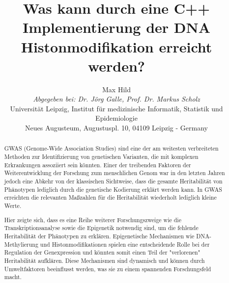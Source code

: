 \documentclass{SeminarV2}
\begin{document}
\title{Was kann durch eine C++ Implementierung der DNA Histonmodifikation erreicht werden?}

\author{Max Hild
\vspace{.3cm}\\
%
\emph{Abgegeben bei: Dr. J{\"o}rg Galle, Prof. Dr. Markus Scholz}
\vspace{.1cm}\\
Universit{\"a}t Leipzig, Institut f{\"u}r medizinische Informatik, Statistik und Epidemiologie\\
Neues Augusteum, Augustuspl. 10, 04109 Leipzig - Germany
}



\maketitle

\begin{abstract}
  \sloppy
  GWAS (Genome-Wide Association Studies) sind eine der am weitesten verbreiteten Methoden
  zur Identifizierung von genetischen Varianten, die mit komplexen Erkrankungen assoziiert sein k{\"o}nnten.
  Einer der treibenden Faktoren der Weiterentwicklung der Forschung zum menschlichen Genom
  war in den letzten Jahren jedoch eine Abkehr von der klassischen Sichtweise, dass die
  gesamte Heritabilit{\"a}t von Ph{\"a}notypen lediglich durch die genetische Kodierung
  erkl{\"a}rt werden kann. In GWAS erreichten die relevanten Ma{\ss}zahlen f{\"u}r die Heritabilit{\"a}t
  wiederholt lediglich kleine Werte. \cite{mcclellan-2010}
    
  Hier zeigte sich, dass es eine Reihe weiterer Forschungszweige wie die Transkriptionsanalyse
  sowie die Epigenetik notwendig sind, um die fehlende Heritabilit{\"a}t der Ph{\"a}notypen zu erkl{\"a}ren. 
  Epigenetische Mechanismen wie DNA-Methylierung und Histonmodifikationen spielen eine entscheidende 
  Rolle bei der Regulation der Genexpression und k{\"o}nnten somit einen Teil der "verlorenen" Heritabilit{\"a}t 
  aufkl{\"a}ren. Diese Mechanismen sind dynamisch und k{\"o}nnen durch Umweltfaktoren beeinflusst werden, 
  was sie zu einem spannenden Forschungsfeld macht.
  \end{abstract}
  
\end{document}

